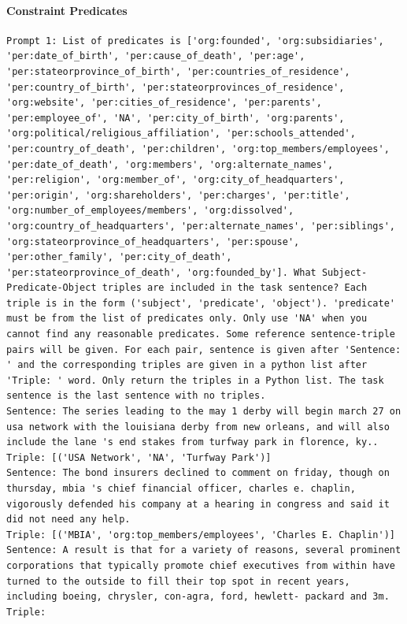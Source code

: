\documentclass{article}
\begin{document}
\paragraph{Constraint Predicates}
\begin{lstlisting}
Prompt 1: List of predicates is ['org:founded', 'org:subsidiaries', 'per:date_of_birth', 'per:cause_of_death', 'per:age', 'per:stateorprovince_of_birth', 'per:countries_of_residence', 'per:country_of_birth', 'per:stateorprovinces_of_residence', 'org:website', 'per:cities_of_residence', 'per:parents', 'per:employee_of', 'NA', 'per:city_of_birth', 'org:parents', 'org:political/religious_affiliation', 'per:schools_attended', 'per:country_of_death', 'per:children', 'org:top_members/employees', 'per:date_of_death', 'org:members', 'org:alternate_names', 'per:religion', 'org:member_of', 'org:city_of_headquarters', 'per:origin', 'org:shareholders', 'per:charges', 'per:title', 'org:number_of_employees/members', 'org:dissolved', 'org:country_of_headquarters', 'per:alternate_names', 'per:siblings', 'org:stateorprovince_of_headquarters', 'per:spouse', 'per:other_family', 'per:city_of_death', 'per:stateorprovince_of_death', 'org:founded_by']. What Subject-Predicate-Object triples are included in the task sentence? Each triple is in the form ('subject', 'predicate', 'object'). 'predicate' must be from the list of predicates only. Only use 'NA' when you cannot find any reasonable predicates. Some reference sentence-triple pairs will be given. For each pair, sentence is given after 'Sentence: ' and the corresponding triples are given in a python list after 'Triple: ' word. Only return the triples in a Python list. The task sentence is the last sentence with no triples.
Sentence: The series leading to the may 1 derby will begin march 27 on usa network with the louisiana derby from new orleans, and will also include the lane 's end stakes from turfway park in florence, ky.. 
Triple: [('USA Network', 'NA', 'Turfway Park')]
Sentence: The bond insurers declined to comment on friday, though on thursday, mbia 's chief financial officer, charles e. chaplin, vigorously defended his company at a hearing in congress and said it did not need any help. 
Triple: [('MBIA', 'org:top_members/employees', 'Charles E. Chaplin')]
Sentence: A result is that for a variety of reasons, several prominent corporations that typically promote chief executives from within have turned to the outside to fill their top spot in recent years, including boeing, chrysler, con-agra, ford, hewlett- packard and 3m. 
Triple:


\end{lstlisting}
\end{document}
